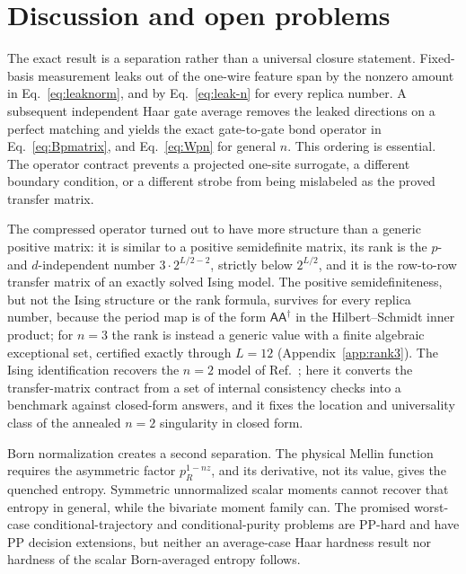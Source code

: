 \documentclass[aps,prx,reprint,superscriptaddress,nobibnotes,longbibliography]{revtex4-2}
\theoremstyle{remark}
\begin{document}
\section{Discussion and open problems}

The exact result is a separation rather than a universal closure statement.  Fixed-basis measurement leaks out of the one-wire feature span by the nonzero amount in Eq.~\eqref{eq:leaknorm}, and by Eq.~\eqref{eq:leak-n} for every replica number.  A subsequent independent Haar gate average removes the leaked directions on a perfect matching and yields the exact gate-to-gate bond operator in Eq.~\eqref{eq:Bpmatrix}, and Eq.~\eqref{eq:Wpn} for general $n$.  This ordering is essential.  The operator contract prevents a projected one-site surrogate, a different boundary condition, or a different strobe from being mislabeled as the proved transfer matrix.

The compressed operator turned out to have more structure than a generic positive matrix: it is similar to a positive semidefinite matrix, its rank is the $p$- and $d$-independent number $3\cdot2^{L/2-2}$, strictly below $2^{L/2}$, and it is the row-to-row transfer matrix of an exactly solved Ising model.  The positive semidefiniteness, but not the Ising structure or the rank formula, survives for every replica number, because the period map is of the form $\mathsf A\mathsf A^\dagger$ in the Hilbert--Schmidt inner product; for $n=3$ the rank is instead a generic value with a finite algebraic exceptional set, certified exactly through $L=12$ (Appendix~\ref{app:rank3}).  The Ising identification recovers the $n=2$ model of Ref.~\cite{Bao2020}; here it converts the transfer-matrix contract from a set of internal consistency checks into a benchmark against closed-form answers, and it fixes the location and universality class of the annealed $n=2$ singularity in closed form.

Born normalization creates a second separation.  The physical Mellin function requires the asymmetric factor $p_R^{1-nz}$, and its derivative, not its value, gives the quenched entropy.  Symmetric unnormalized scalar moments cannot recover that entropy in general, while the bivariate moment family can.  The promised worst-case conditional-trajectory and conditional-purity problems are PP-hard and have PP decision extensions, but neither an average-case Haar hardness result nor hardness of the scalar Born-averaged entropy follows.
\end{document}
